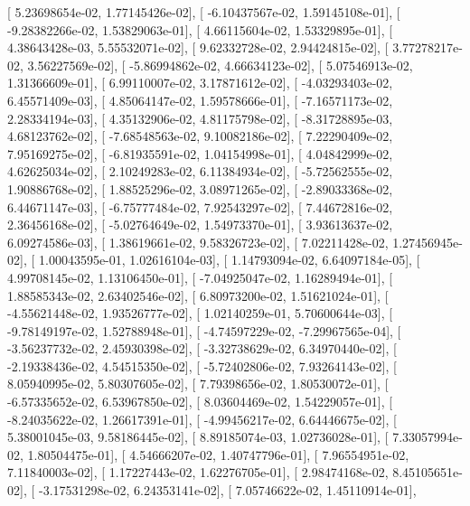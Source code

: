 \documentclass{article}
\begin{document}
       [  5.23698654e-02,   1.77145426e-02],
       [ -6.10437567e-02,   1.59145108e-01],
       [ -9.28382266e-02,   1.53829063e-01],
       [  4.66115604e-02,   1.53329895e-01],
       [  4.38643428e-03,   5.55532071e-02],
       [  9.62332728e-02,   2.94424815e-02],
       [  3.77278217e-02,   3.56227569e-02],
       [ -5.86994862e-02,   4.66634123e-02],
       [  5.07546913e-02,   1.31366609e-01],
       [  6.99110007e-02,   3.17871612e-02],
       [ -4.03293403e-02,   6.45571409e-03],
       [  4.85064147e-02,   1.59578666e-01],
       [ -7.16571173e-02,   2.28334194e-03],
       [  4.35132906e-02,   4.81175798e-02],
       [ -8.31728895e-03,   4.68123762e-02],
       [ -7.68548563e-02,   9.10082186e-02],
       [  7.22290409e-02,   7.95169275e-02],
       [ -6.81935591e-02,   1.04154998e-01],
       [  4.04842999e-02,   4.62625034e-02],
       [  2.10249283e-02,   6.11384934e-02],
       [ -5.72562555e-02,   1.90886768e-02],
       [  1.88525296e-02,   3.08971265e-02],
       [ -2.89033368e-02,   6.44671147e-03],
       [ -6.75777484e-02,   7.92543297e-02],
       [  7.44672816e-02,   2.36456168e-02],
       [ -5.02764649e-02,   1.54973370e-01],
       [  3.93613637e-02,   6.09274586e-03],
       [  1.38619661e-02,   9.58326723e-02],
       [  7.02211428e-02,   1.27456945e-02],
       [  1.00043595e-01,   1.02616104e-03],
       [  1.14793094e-02,   6.64097184e-05],
       [  4.99708145e-02,   1.13106450e-01],
       [ -7.04925047e-02,   1.16289494e-01],
       [  1.88585343e-02,   2.63402546e-02],
       [  6.80973200e-02,   1.51621024e-01],
       [ -4.55621448e-02,   1.93526777e-02],
       [  1.02140259e-01,   5.70600644e-03],
       [ -9.78149197e-02,   1.52788948e-01],
       [ -4.74597229e-02,  -7.29967565e-04],
       [ -3.56237732e-02,   2.45930398e-02],
       [ -3.32738629e-02,   6.34970440e-02],
       [ -2.19338436e-02,   4.54515350e-02],
       [ -5.72402806e-02,   7.93264143e-02],
       [  8.05940995e-02,   5.80307605e-02],
       [  7.79398656e-02,   1.80530072e-01],
       [ -6.57335652e-02,   6.53967850e-02],
       [  8.03604469e-02,   1.54229057e-01],
       [ -8.24035622e-02,   1.26617391e-01],
       [ -4.99456217e-02,   6.64446675e-02],
       [  5.38001045e-03,   9.58186445e-02],
       [  8.89185074e-03,   1.02736028e-01],
       [  7.33057994e-02,   1.80504475e-01],
       [  4.54666207e-02,   1.40747796e-01],
       [  7.96554951e-02,   7.11840003e-02],
       [  1.17227443e-02,   1.62276705e-01],
       [  2.98474168e-02,   8.45105651e-02],
       [ -3.17531298e-02,   6.24353141e-02],
       [  7.05746622e-02,   1.45110914e-01],
\end{document}
